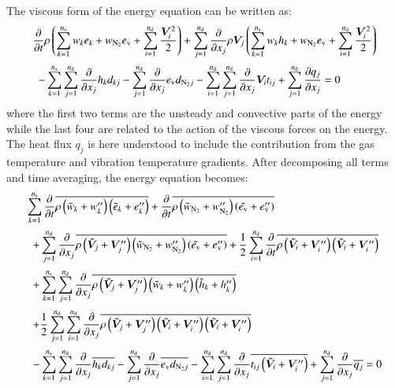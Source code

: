 \documentclass{warpdoc}
\newcommand{\alb}{\vspace{0.2cm}\\} %
\newcommand{\nd}{{{n}_{\rm d}}}
\newcommand{\ns}{{{n}_{\rm s}}}
\newcommand{\mfd}{\displaystyle}
\newcommand{\ev}{e_{\rm v}}
\newcommand{\cNtwo}{w_{\rm N_2}}
\begin{document}
The viscous form of the energy equation can be written as:
%
\begin{equation}
 \begin{array}{l}
  \mfd\frac{\partial}{\partial t} \rho\left( \sum_{k=1}^{\ns} w_k e_k+\cNtwo \ev +\sum_{i=1}^{\nd} \frac{\bm{V}_i^2}{2}\right)
   + \sum_{j=1}^{\nd} \frac{\partial}{\partial x_j} \rho \bm{V}_j \left( \sum_{k=1}^\ns w_k  h_k+\cNtwo\ev+\sum_{i=1}^{\nd} \frac{\bm{V}_i^2}{2}\right) \alb
  \mfd
~~   - \sum_{k=1}^{\ns}\sum_{j=1}^{\nd} \frac{\partial }{\partial x_j} h_k d_{kj}
   - \sum_{j=1}^{\nd} \frac{\partial }{\partial x_j} \ev d_{{\rm N_2}j }
   - \sum_{i=1}^{\nd}\sum_{j=1}^{\nd} \frac{\partial }{\partial x_j} \bm{V}_i t_{ij}
   + \sum_{j=1}^{\nd} \frac{\partial q_j}{\partial x_j}
   = 0
 \end{array}
\end{equation}
%
where the first two terms are the unsteady and convective parts of the energy
while the last four are related to the action of the viscous forces on the energy.
The heat flux $q_j$ is here understood to include the contribution from the gas temperature and vibration temperature gradients. After decomposing all terms and time averaging, the energy equation becomes:
%
\begin{displaymath}
 \begin{array}{l}
    \mfd\sum_{k=1}^{\ns} \frac{\partial}{\partial t} \overline{\rho \left({\wtilde{w}_k} + w_k^{\prime\prime} \right) \left( {\wtilde{e}_k} +e_k^{\prime\prime} \right)}
    +\frac{\partial}{\partial t} \overline{\rho \left({\wtilde{w}_{\rm N_2}} + \cNtwo^{\prime\prime} \right) \left( \wtilde{\ev} +\ev^{\prime\prime} \right)}\alb\mfd
%
~~+\sum_{j=1}^{\nd} \frac{\partial}{\partial x_j} \overline{ \rho \left( {\wtilde{\bm{V}}_j}+\bm{V}_j^{\prime\prime} \right)  \left( {\wtilde{w}_{\rm N_2}}+\cNtwo^{\prime\prime} \right) \left( \wtilde{\ev} + \ev^{\prime\prime} \right) }
       +\frac{1}{2}\sum_{i=1}^{\nd}\frac{\partial}{\partial t} \overline{\rho  \left({\wtilde{\bm{V}}_i}+\bm{V}_i^{\prime\prime} \right) \left({\wtilde{\bm{V}}_i}+\bm{V}_i^{\prime\prime} \right)}
       \alb
% 
   \mfd ~~+\sum_{k=1}^{\ns} \sum_{j=1}^{\nd} \frac{\partial}{\partial x_j} \overline{ \rho \left( {\wtilde{\bm{V}}_j}+\bm{V}_j^{\prime\prime} \right)  \left( {\wtilde{w}_k}+w_k^{\prime\prime} \right) \left( {\wtilde{h}_k} + h_k^{\prime\prime} \right) }\alb\mfd
%
         ~~+\frac{1}{2}\sum_{j=1}^{\nd} \sum_{i=1}^{\nd} \frac{\partial}{\partial x_j} \overline{\rho \left( {\wtilde{\bm{V}}_j}+\bm{V}_j^{\prime\prime} \right)  \left( {\wtilde{\bm{V}}_i}+\bm{V}_i^{\prime\prime} \right) \left( {\wtilde{\bm{V}}_i}+\bm{V}_i^{\prime\prime} \right)}\alb
%
    \mfd ~~- \sum_{k=1}^{\ns}\sum_{j=1}^{\nd} \frac{\partial }{\partial x_j} \overline{ h_k d_{kj}}
   - \sum_{j=1}^{\nd} \frac{\partial }{\partial x_j} \overline{\ev d_{{\rm N_2}j} }
         - \sum_{i=1}^{\nd}\sum_{j=1}^{\nd} \frac{\partial }{\partial x_j} \overline{ t_{ij} \left( {\wtilde{\bm{V}}_i} +\bm{V}_i^{\prime\prime} \right) }
         + \sum_{j=1}^{\nd} \frac{\partial }{\partial x_j} \overline{q_j} = 0
\end{array}
\end{displaymath}
\end{document}
